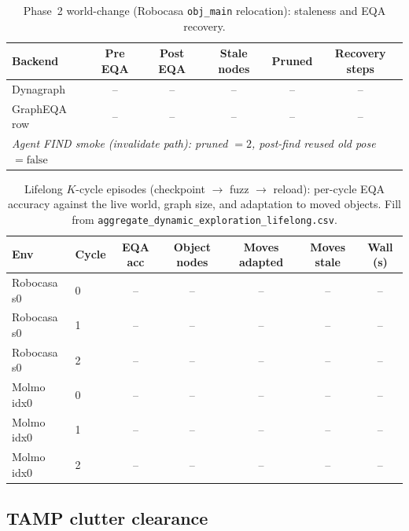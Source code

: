 \begin{table}[t]
  \centering
  \caption{Phase~2 world-change (Robocasa \texttt{obj\_main} relocation): staleness and EQA recovery.}
  \label{tab:dynamic_explore_world_change}
  \small
  \begin{tabular}{@{}lccccc@{}}
    \toprule
    Backend & Pre EQA & Post EQA & Stale nodes & Pruned & Recovery steps \\
    \midrule
    Dynagraph & -- & -- & -- & -- & -- \\
    GraphEQA row & -- & -- & -- & -- & -- \\
    \midrule
    \multicolumn{6}{l}{\textit{Agent FIND smoke (invalidate path): pruned $=2$, post-find reused old pose $=\mathrm{false}$}} \\
    \bottomrule
  \end{tabular}
\end{table}

\begin{table}[t]
  \centering
  \caption{Lifelong $K$-cycle episodes (checkpoint $\rightarrow$ fuzz $\rightarrow$ reload): per-cycle EQA accuracy against the live world, graph size, and adaptation to moved objects. Fill from \texttt{aggregate\_dynamic\_exploration\_lifelong.csv}.}
  \label{tab:dynamic_explore_lifelong}
  \small
  \begin{tabular}{@{}llccccc@{}}
    \toprule
    Env & Cycle & EQA acc & Object nodes & Moves adapted & Moves stale & Wall (s) \\
    \midrule
    Robocasa s0 & 0 & -- & -- & -- & -- & -- \\
    Robocasa s0 & 1 & -- & -- & -- & -- & -- \\
    Robocasa s0 & 2 & -- & -- & -- & -- & -- \\
    Molmo idx0 & 0 & -- & -- & -- & -- & -- \\
    Molmo idx0 & 1 & -- & -- & -- & -- & -- \\
    Molmo idx0 & 2 & -- & -- & -- & -- & -- \\
    \bottomrule
  \end{tabular}
\end{table}

\subsection{TAMP clutter clearance}
\label{sec:tamp_clutter_results}

